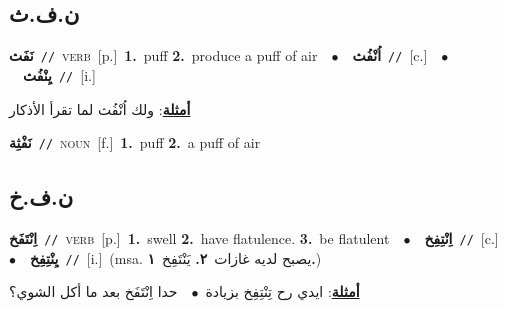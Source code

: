 \documentclass[10pt,a4paper,twoside]{article} %
\begin{document}
\begin{multicols}{2}
\vspace{-3mm}
\subsection*{\color{blue}\foreignlanguage{arabic}{ن.ف.ث}\color{blue}{}} 

{\setlength\topsep{0pt}\textbf{\foreignlanguage{arabic}{نَفَث}}\ {\color{gray}\texttt{//}\color{black}}\ \textsc{verb}\ [p.]\ \textbf{1.}~puff  \textbf{2.}~produce a puff of air\ \ $\bullet$\ \ \setlength\topsep{0pt}\textbf{\foreignlanguage{arabic}{اُنْفُث}}\ {\color{gray}\texttt{//}\color{black}}\ [c.]\ \ $\bullet$\ \ \setlength\topsep{0pt}\textbf{\foreignlanguage{arabic}{يِنْفُث}}\ {\color{gray}\texttt{//}\color{black}}\ [i.]\  \begin{flushright}\color{gray}\foreignlanguage{arabic}{\textbf{\underline{\foreignlanguage{arabic}{أمثلة}}}: ولك اُنْفُث لما تقرأ الأذكار}\end{flushright}\color{black}} \vspace{2mm}

{\setlength\topsep{0pt}\textbf{\foreignlanguage{arabic}{نَفْثِة}}\ {\color{gray}\texttt{//}\color{black}}\ \textsc{noun}\ [f.]\ \textbf{1.}~puff  \textbf{2.}~a puff of air\ } \vspace{2mm}

\vspace{-3mm}
\subsection*{\color{blue}\foreignlanguage{arabic}{ن.ف.خ}\color{blue}{}} 

{\setlength\topsep{0pt}\textbf{\foreignlanguage{arabic}{اِنْتَفَخ}}\ {\color{gray}\texttt{//}\color{black}}\ \textsc{verb}\ [p.]\ \textbf{1.}~swell  \textbf{2.}~have flatulence.  \textbf{3.}~be flatulent\ \ $\bullet$\ \ \setlength\topsep{0pt}\textbf{\foreignlanguage{arabic}{اِنْتِفِخ}}\ {\color{gray}\texttt{//}\color{black}}\ [c.]\ \ $\bullet$\ \ \setlength\topsep{0pt}\textbf{\foreignlanguage{arabic}{يِنْتِفِخ}}\ {\color{gray}\texttt{//}\color{black}}\ [i.]\ \color{gray}(msa. \foreignlanguage{arabic}{يصبح لديه غازات}~\foreignlanguage{arabic}{\textbf{٢.}}  \foreignlanguage{arabic}{يَنْتَفِخ}~\foreignlanguage{arabic}{\textbf{١.}})\color{black}\  \begin{flushright}\color{gray}\foreignlanguage{arabic}{\textbf{\underline{\foreignlanguage{arabic}{أمثلة}}}: ايدي رح تِنْتِفِخ بزيادة\ $\bullet$\ \  حدا اِنْتَفَخ بعد ما أكل الشوي؟}\end{flushright}\color{black}} \vspace{2mm}


\end{multicols}
\end{document}
